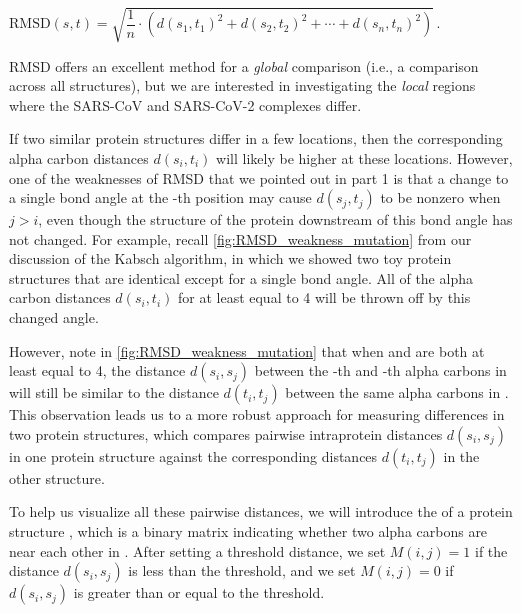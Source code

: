 \begin{center}
$\text{RMSD}(s, t) = \sqrt{\dfrac{1}{n} \cdot (d(s_1, t_1)^2 + d(s_2, t_2)^2 + \cdots + d(s_n, t_n)^2)}$\,.
\end{center}

\noindent RMSD offers an excellent method for a \textit{global} comparison (i.e., a comparison across all structures), but we are interested in investigating the \textit{local} regions where the SARS-CoV and SARS-CoV-2 complexes differ.

If two similar protein structures differ in a few locations, then the corresponding alpha carbon distances $d(s_{i}, t_{i})$ will likely be higher at these locations. However, one of the weaknesses of RMSD that we pointed out in part 1 is that a change to a single bond angle at the -th position may cause $d(s_{j}, t_{j})$ to be nonzero when $j > i$, even though the structure of the protein downstream of this bond angle has not changed. For example, recall \autoref{fig:RMSD_weakness_mutation} from our discussion of the Kabsch algorithm, in which we showed two toy protein structures that are identical except for a single bond angle. All of the alpha carbon distances $d(s_{i}, t_{i})$ for  at least equal to 4 will be thrown off by this changed angle.

However, note in \autoref{fig:RMSD_weakness_mutation}  that when  and  are both at least equal to 4, the distance $d(s_{i}, s_{j})$ between the -th and -th alpha carbons in  will still be similar to the distance $d(t_{i}, t_{j})$ between the same alpha carbons in . This observation leads us to a more robust approach for measuring differences in two protein structures, which compares  pairwise intraprotein distances $d(s_{i}, s_{j})$ in one protein structure against the corresponding distances $d(t_{i}, t_{j})$ in the other structure.

To help us visualize all these pairwise distances, we will introduce the  of a protein structure , which is a binary matrix indicating whether two alpha carbons are near each other in . After setting a threshold distance, we set $M(i, j) = 1$ if the distance $d(s_{i}, s_{j})$ is less than the threshold, and we set $M(i, j) = 0$ if $d(s_{i}, s_{j})$ is greater than or equal to the threshold.

